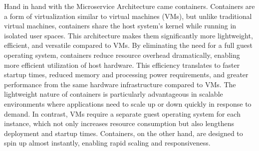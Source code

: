 Hand in hand with the Microservice Architecture came containers. Containers are a form of virtualization similar to virtual machines (VMs), but unlike traditional virtual machines, containers share the host system's kernel while running in isolated user spaces. This architecture makes them significantly more lightweight, efficient, and versatile compared to VMs. By eliminating the need for a full guest operating system, containers reduce resource overhead dramatically, enabling more efficient utilization of host hardware. This efficiency translates to faster startup times, reduced memory and processing power requirements, and greater performance from the same hardware infrastructure compared to VMs\cite{Pahl2015}. The lightweight nature of containers is particularly advantageous in scalable environments where applications need to scale up or down quickly in response to demand. In contrast, VMs require a separate guest operating system for each instance, which not only increases resource consumption but also lengthens deployment and startup times. Containers, on the other hand, are designed to spin up almost instantly, enabling rapid scaling and responsiveness.

